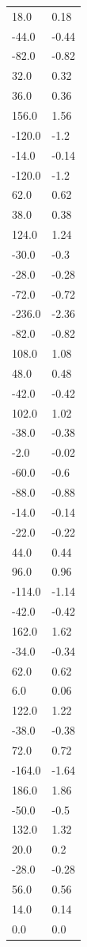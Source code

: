 \begin{longtable}{ll}
18.0 & 0.18 \\
-44.0 & -0.44 \\
-82.0 & -0.82 \\
32.0 & 0.32 \\
36.0 & 0.36 \\
156.0 & 1.56 \\
-120.0 & -1.2 \\
-14.0 & -0.14 \\
-120.0 & -1.2 \\
62.0 & 0.62 \\
38.0 & 0.38 \\
124.0 & 1.24 \\
-30.0 & -0.3 \\
-28.0 & -0.28 \\
-72.0 & -0.72 \\
-236.0 & -2.36 \\
-82.0 & -0.82 \\
108.0 & 1.08 \\
48.0 & 0.48 \\
-42.0 & -0.42 \\
102.0 & 1.02 \\
-38.0 & -0.38 \\
-2.0 & -0.02 \\
-60.0 & -0.6 \\
-88.0 & -0.88 \\
-14.0 & -0.14 \\
-22.0 & -0.22 \\
44.0 & 0.44 \\
96.0 & 0.96 \\
-114.0 & -1.14 \\
-42.0 & -0.42 \\
162.0 & 1.62 \\
-34.0 & -0.34 \\
62.0 & 0.62 \\
6.0 & 0.06 \\
122.0 & 1.22 \\
-38.0 & -0.38 \\
72.0 & 0.72 \\
-164.0 & -1.64 \\
186.0 & 1.86 \\
-50.0 & -0.5 \\
132.0 & 1.32 \\
20.0 & 0.2 \\
-28.0 & -0.28 \\
56.0 & 0.56 \\
14.0 & 0.14 \\
0.0 & 0.0 \\

\end{longtable}
